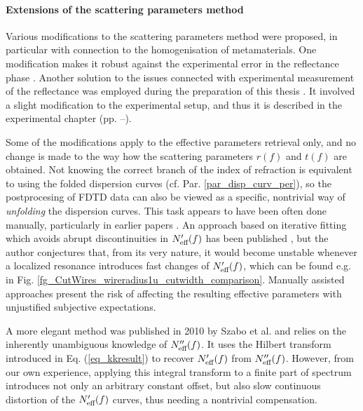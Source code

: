 \paragraph{Extensions of the scattering parameters method} %
Various modifications to the scattering parameters method were proposed, in particular with connection to the homogenisation of metamaterials. One modification makes it robust against the experimental error in the reflectance phase \cite{chalapat2009wideband}. %
Another solution to the issues connected with experimental measurement of the reflectance was employed during the preparation of this thesis \cite{nemec2012resonant}. It involved a slight modification to the experimental setup, and thus it is described in the experimental chapter (pp. \pageref{srtm}--\pageref{srtm2}).

Some of the modifications apply to the effective parameters retrieval only, and no change is made to the way how  the scattering parameters $r(f)$ and $t(f)$ are obtained.
Not knowing the correct branch of the index of refraction is equivalent to using the folded dispersion curves (cf. Par. \ref{par_disp_curv_per}), %
so the postprocesing of FDTD data can also be viewed as a specific, nontrivial way of \textit{unfolding} the dispersion curves. This task appears to have been often done manually, particularly in earlier papers \cite{smith2002determination}. An approach based on iterative fitting which avoids abrupt discontinuities in $N_{\text{eff} }'(f)$ has been published \cite{chen2004robust}, but the author conjectures that, from its very nature, it would become unstable whenever a localized resonance introduces fast changes of $N_{\text{eff} }'(f)$, which can be found e.g. in Fig. \ref{fg_CutWires_wireradius1u_cutwidth_comparison}. Manually assisted approaches present the risk of affecting the resulting effective parameters with unjustified subjective expectations.

A more elegant method was published in 2010 by Szabo et al. \cite{szabo2010unique} and relies on the inherently unambiguous knowledge of $N_{\text{eff} }''(f)$. It uses the Hilbert transform introduced in Eq. (\ref{eq_kkresult}) to recover $N_{\text{eff} }'(f)$ from $N_{\text{eff} }''(f)$. 
However, from our own experience, applying this integral transform to a finite part of spectrum introduces not only an arbitrary constant offset, but also slow continuous distortion of the $N_{\text{eff} }'(f)$ curves, thus needing a nontrivial compensation.

